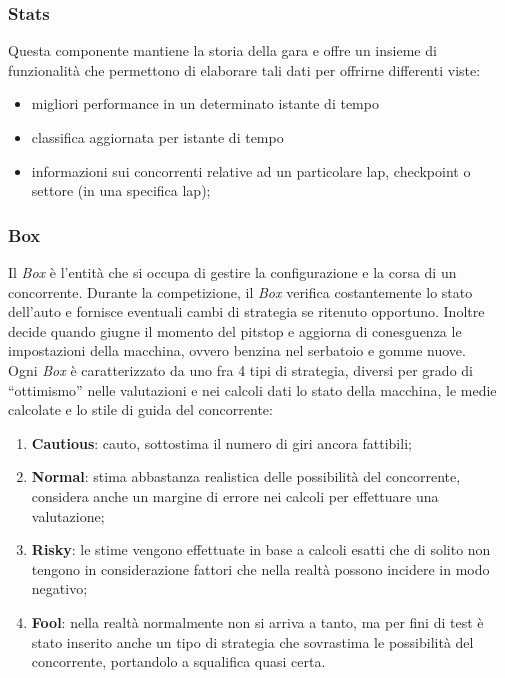 \subsubsection{Stats}
Questa componente mantiene la storia della gara e offre un insieme di funzionalit\`{a} che permettono di elaborare tali dati per offrirne differenti viste:
	\begin{itemize}
		\item migliori performance in un determinato istante di tempo
		\item classifica aggiornata per istante di tempo
		\item informazioni sui concorrenti relative ad un particolare lap, checkpoint o settore (in una specifica lap);
	\end{itemize}
\subsubsection{Box}
\label{box}
Il \emph{Box} \`{e} l'entit\`{a} che si occupa di gestire la configurazione e la corsa di un concorrente. Durante la competizione, il \emph{Box} verifica costantemente
lo stato dell'auto e fornisce eventuali cambi di strategia se ritenuto opportuno. Inoltre decide quando giugne il momento del pitstop 
e aggiorna di conesguenza le impostazioni della macchina, ovvero benzina nel serbatoio e gomme nuove.\\
Ogni \emph{Box} \`{e} caratterizzato da uno fra 4 tipi di strategia, diversi per grado di ``ottimismo'' nelle valutazioni e nei calcoli dati lo stato della 
macchina, le medie calcolate e lo stile di guida del concorrente:
	\begin{enumerate}
		\item \textbf{Cautious}: cauto, sottostima il numero di giri ancora fattibili;
		\item \textbf{Normal}: stima abbastanza realistica delle possibilit\`{a} del concorrente, considera anche un margine di errore nei calcoli
			per effettuare una valutazione;
		\item \textbf{Risky}: le stime vengono effettuate in base a calcoli esatti che di solito non tengono in considerazione fattori che nella
			realt\`{a} possono incidere in modo negativo;
		\item \textbf{Fool}: nella realt\`{a} normalmente non si arriva a tanto, ma per fini di test \`{e} stato inserito anche un tipo di strategia
			che sovrastima le possibilit\`{a} del concorrente, portandolo a squalifica quasi certa.
	\end{enumerate}
